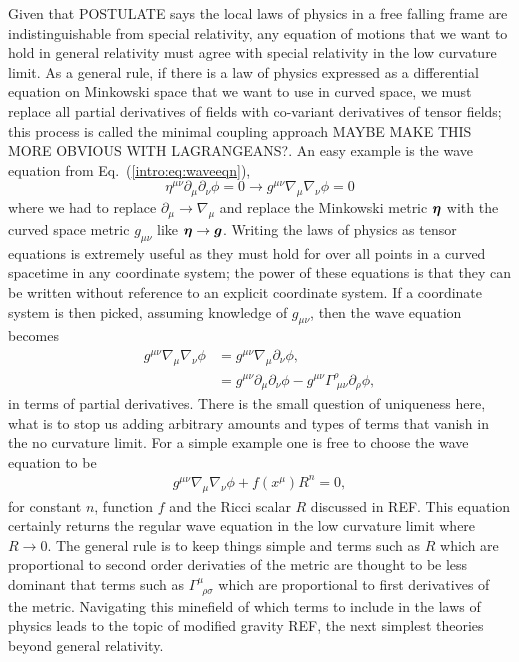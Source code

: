Given that POSTULATE says the local laws of physics in a free falling frame are indistinguishable from special relativity, any equation of motions that we want to hold in general relativity must agree with special relativity in the low curvature limit. As a general rule, if there is a law of physics expressed as a differential equation on Minkowski space that we want to use in curved space, we must replace all partial derivatives of fields with co-variant derivatives of tensor fields; this process is called the minimal coupling approach MAYBE MAKE THIS MORE OBVIOUS WITH LAGRANGEANS?. An easy example is the wave equation from Eq.~(\ref{intro:eq:waveeqn}),
\begin{equation} 
\eta^{\mu\nu}\partial_\mu \partial_\nu \phi=0 \rightarrow g^{\mu\nu}\nabla_\mu \nabla_\nu\phi =0
\end{equation}
where we had to replace $\partial_\mu \rightarrow \nabla_\mu$ and replace the Minkowski metric $\boldsymbol{\eta}$ with the curved space metric $g_{\mu\nu}$ like $\boldsymbol{\eta}\rightarrow \boldsymbol{g}$. Writing the laws of physics as tensor equations is extremely useful as they must hold for over all points in a curved spacetime in any coordinate system; the power of these equations is that they can be written without reference to an explicit coordinate system. If a coordinate system is then picked, assuming knowledge of $g_{\mu\nu}$, then the wave equation becomes
\begin{align}
g^{\mu\nu}\nabla_\mu \nabla_\nu \phi &= g^{\mu\nu}\nabla_\mu \partial_\nu \phi ,\\
&= g^{\mu\nu}\partial_\mu \partial_\nu \phi - g^{\mu\nu}\Gamma^\rho_{\,\,\mu\nu}\partial_\rho \phi,
\end{align}
in terms of partial derivatives. There is the small question of uniqueness here, what is to stop us adding arbitrary amounts and types of terms that vanish in the no curvature limit. For a simple example one is free to choose the wave equation to be
\begin{align}
g^{\mu\nu}\nabla_\mu\nabla_\nu \phi + f(x^\mu) R^n = 0,
\end{align}
for constant $n$, function $f$ and the Ricci scalar $R$ discussed in REF. This equation certainly returns the regular wave equation in the low curvature limit where $R\rightarrow 0$. The general rule is to keep things simple and terms such as $R$ which are proportional to second order derivaties of the metric are thought to be less dominant that terms such as $\Gamma^\mu_{\,\,\,\rho\sigma}$ which are proportional to first derivatives of the metric. Navigating this minefield of which terms to include in the laws of physics leads to the topic of modified gravity REF, the next simplest theories beyond general relativity.

